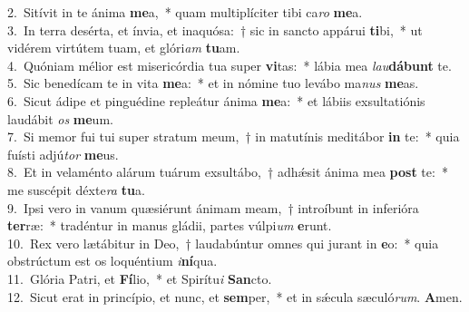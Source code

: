{2.~}Sitívit in te ánima \textbf{me}a,~* quam multiplíciter tibi ca\textit{ro} \textbf{me}a.\\
{3.~}In terra desérta, et ínvia, et inaquósa:~† sic in sancto appárui \textbf{ti}bi,~* ut vidérem virtútem tuam, et glóri\textit{am} \textbf{tu}am.\\
{4.~}Quóniam mélior est misericórdia tua super \textbf{vi}tas:~* lábia mea \textit{lau}\textbf{dá}\textbf{bunt} te.\\
{5.~}Sic benedícam te in vita \textbf{me}a:~* et in nómine tuo levábo ma\textit{nus} \textbf{me}as.\\
{6.~}Sicut ádipe et pinguédine repleátur ánima \textbf{me}a:~* et lábiis exsultatiónis laudábit \textit{os} \textbf{me}um.\\
{7.~}Si memor fui tui super stratum meum,~† in matutínis meditábor \textbf{in} te:~* quia fuísti adjú\textit{tor} \textbf{me}us.\\
{8.~}Et in velaménto alárum tuárum exsultábo,~† adhǽsit ánima mea \textbf{post} te:~* me suscépit déxte\textit{ra} \textbf{tu}a.\\
{9.~}Ipsi vero in vanum quæsiérunt ánimam meam,~† introíbunt in inferióra \textbf{ter}ræ:~* tradéntur in manus gládii, partes vúlpi\textit{um} \textbf{e}runt.\\
{10.~}Rex vero lætábitur in Deo,~† laudabúntur omnes qui jurant in \textbf{e}o:~* quia obstrúctum est os loquéntium \textit{i}\textbf{ní}qua.\\
{11.~}Glória Patri, et \textbf{Fí}lio,~* et Spirítu\textit{i} \textbf{San}cto.\\
{12.~}Sicut erat in princípio, et nunc, et \textbf{sem}per,~* et in sǽcula sæculó\textit{rum}. \textbf{A}men.\\
